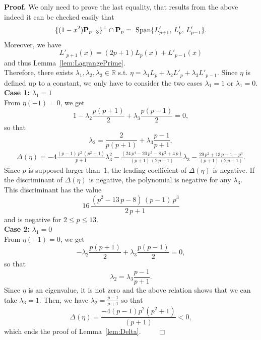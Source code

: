 \documentclass[final]{siamltex}
\begin{document}
{\bf Proof.} We only need to prove the last equality, that results from the above indeed it can be checked easily that
\[
\{(1-x^2) {\mathbf{P}}_{p-3}\}^\bot \cap {\mathbf{P}}_p = \hbox{ Span}\{L'_{p+1},\,L'_p,\,L'_{p-1}\}.
\]
Moreover, we have
\[
L'_{p+1}(x)=(2p+1)L_p(x)+L'_{p-1}(x)
\]
and thus Lemma~\ref{lem:LagrangePrime}.\\
Therefore, there exists $\lambda_1,\lambda_2,\lambda_3 \in{{\mathbb R}}$ s.t.
$\eta=\lambda_1 L_{p} + \lambda_2 L'_{p} + \lambda_3 L'_{p-1}$.
Since $\eta$ is defined up to a constant, we only
have to consider the two cases
$\lambda_1=1$ or $\lambda_1=0$.\\[1.5mm]
{\bf Case 1:} $\lambda_1=1$\\
 From $\eta(-1)=0$, we get
\[
1-\lambda_2 \frac{p(p+1)}{2} +\lambda_3 \frac{p(p-1)}{2} =0,
\]
so that
\[
\lambda_2 = \frac{2}{p(p+1)} +\lambda_3  \frac{p-1}{p+1},
\]
\begin{eqnarray*}
\Delta(\eta)=\displaystyle - 4 \frac{(p-1)\,p^{2}\,(p^{2} +  1)}{p + 1}\lambda_3^{2}  -  
\frac {(24\,p^{4} - 20\,p^{3} - 8\,p^{2} + 4\,p)}{(p + 1)\,(2\,p + 1)}\lambda_3 
-\frac {29\,p^{2} + 13\,p - 1 - p^{3}}{(p + 1)\,(2\,p + 1)}.
\end{eqnarray*}
Since $p$ is supposed larger than~1, the
leading coefficient of $\Delta(\eta)$ is negative. If the discriminant of
$\Delta(\eta)$ is negative, the polynomial is negative for any
$\lambda_3$. This discriminant has the value
\[
16\,{\displaystyle \frac {(p^{2} - 13\,p - 8)\,(p - 1)\,p^{3}}{2
\,p + 1}}
\]
and is negative for $2\le p \le 13$.\\[1.5mm]
{\bf Case 2:} $\lambda_1=0$\\
 From $\eta(-1)=0$, we get
\[
-\lambda_2 \frac{p(p+1)}{2} +\lambda_3 \frac{p(p-1)}{2} =0,
\]
so that
\[
\lambda_2 = \lambda_3  \frac{p-1}{p+1}.
\]
Since $\eta$ is an eigenvalue, it is not zero and the above relation
shows that we can take $\lambda_3=1$. Then, we have
$\lambda_2 = \frac{p-1}{p+1}$ so that
$$
\Delta(\eta)=\frac{-4(p-1)p^2(p^2+1)}{(p+1)} < 0,
$$
which ends the proof of Lemma~\ref{lem:Delta}. $\qquad \Box$
\end{document}
